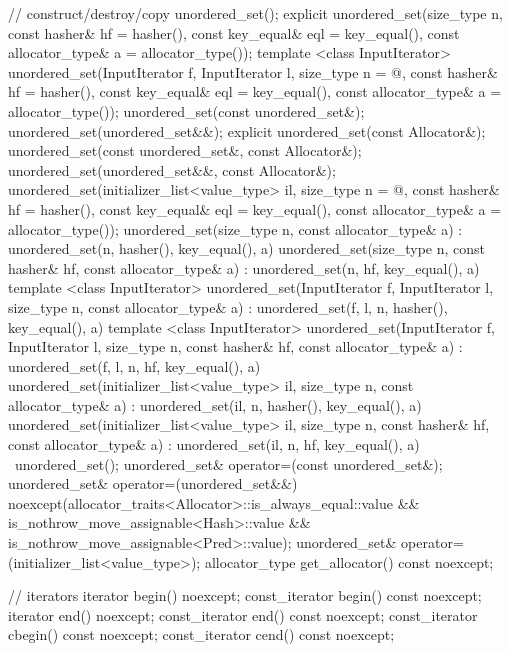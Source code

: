 \begin{codeblock}
{{    // construct/destroy/copy
    unordered_set();
    explicit unordered_set(size_type n,
                           const hasher& hf = hasher(),
                           const key_equal& eql = key_equal(),
                           const allocator_type& a = allocator_type());
    template <class InputIterator>
      unordered_set(InputIterator f, InputIterator l,
                    size_type n = @\seebelow@,
                    const hasher& hf = hasher(),
                    const key_equal& eql = key_equal(),
                    const allocator_type& a = allocator_type());
    unordered_set(const unordered_set&);
    unordered_set(unordered_set&&);
    explicit unordered_set(const Allocator&);
    unordered_set(const unordered_set&, const Allocator&);
    unordered_set(unordered_set&&, const Allocator&);
    unordered_set(initializer_list<value_type> il,
                  size_type n = @\seebelow@,
                  const hasher& hf = hasher(),
                  const key_equal& eql = key_equal(),
                  const allocator_type& a = allocator_type());
    unordered_set(size_type n, const allocator_type& a)
      : unordered_set(n, hasher(), key_equal(), a) { }
    unordered_set(size_type n, const hasher& hf, const allocator_type& a)
      : unordered_set(n, hf, key_equal(), a) { }
    template <class InputIterator>
      unordered_set(InputIterator f, InputIterator l, size_type n, const allocator_type& a)
        : unordered_set(f, l, n, hasher(), key_equal(), a) { }
    template <class InputIterator>
      unordered_set(InputIterator f, InputIterator l, size_type n, const hasher& hf,
                    const allocator_type& a)
      : unordered_set(f, l, n, hf, key_equal(), a) { }
    unordered_set(initializer_list<value_type> il, size_type n, const allocator_type& a)
      : unordered_set(il, n, hasher(), key_equal(), a) { }
    unordered_set(initializer_list<value_type> il, size_type n, const hasher& hf,
                  const allocator_type& a)
      : unordered_set(il, n, hf, key_equal(), a) { }
    ~unordered_set();
    unordered_set& operator=(const unordered_set&);
    unordered_set& operator=(unordered_set&&)
      noexcept(allocator_traits<Allocator>::is_always_equal::value &&
               is_nothrow_move_assignable<Hash>::value &&
               is_nothrow_move_assignable<Pred>::value);
    unordered_set& operator=(initializer_list<value_type>);
    allocator_type get_allocator() const noexcept;

    // iterators
    iterator       begin() noexcept;
    const_iterator begin() const noexcept;
    iterator       end() noexcept;
    const_iterator end() const noexcept;
    const_iterator cbegin() const noexcept;
    const_iterator cend() const noexcept;

}}
\end{codeblock}
